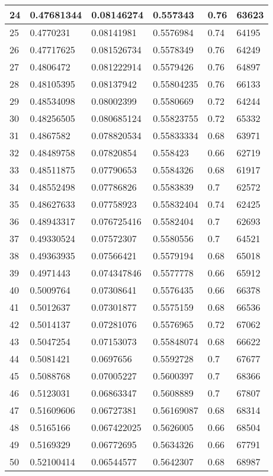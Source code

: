 \begin{longtable}{|l|l|l|l|l|l|}
24 & 0.47681344 & 0.08146274 & 0.557343 & 0.76 & 63623 \\ \hline 
25 & 0.4770231 & 0.08141981 & 0.5576984 & 0.74 & 64195 \\ \hline 
26 & 0.47717625 & 0.081526734 & 0.5578349 & 0.76 & 64249 \\ \hline 
27 & 0.4806472 & 0.081222914 & 0.5579426 & 0.76 & 64897 \\ \hline 
28 & 0.48105395 & 0.08137942 & 0.55804235 & 0.76 & 66133 \\ \hline 
29 & 0.48534098 & 0.08002399 & 0.5580669 & 0.72 & 64244 \\ \hline 
30 & 0.48256505 & 0.080685124 & 0.55823755 & 0.72 & 65332 \\ \hline 
31 & 0.4867582 & 0.078820534 & 0.55833334 & 0.68 & 63971 \\ \hline 
32 & 0.48489758 & 0.07820854 & 0.558423 & 0.66 & 62719 \\ \hline 
33 & 0.48511875 & 0.07790653 & 0.5584326 & 0.68 & 61917 \\ \hline 
34 & 0.48552498 & 0.07786826 & 0.5583839 & 0.7 & 62572 \\ \hline 
35 & 0.48627633 & 0.07758923 & 0.55832404 & 0.74 & 62425 \\ \hline 
36 & 0.48943317 & 0.076725416 & 0.5582404 & 0.7 & 62693 \\ \hline 
37 & 0.49330524 & 0.07572307 & 0.5580556 & 0.7 & 64521 \\ \hline 
38 & 0.49363935 & 0.07566421 & 0.5579194 & 0.68 & 65018 \\ \hline 
39 & 0.4971443 & 0.074347846 & 0.5577778 & 0.66 & 65912 \\ \hline 
40 & 0.5009764 & 0.07308641 & 0.5576435 & 0.66 & 66378 \\ \hline 
41 & 0.5012637 & 0.07301877 & 0.5575159 & 0.68 & 66536 \\ \hline 
42 & 0.5014137 & 0.07281076 & 0.5576965 & 0.72 & 67062 \\ \hline 
43 & 0.5047254 & 0.07153073 & 0.55848074 & 0.68 & 66622 \\ \hline 
44 & 0.5081421 & 0.0697656 & 0.5592728 & 0.7 & 67677 \\ \hline 
45 & 0.5088768 & 0.07005227 & 0.5600397 & 0.7 & 68366 \\ \hline 
46 & 0.5123031 & 0.06863347 & 0.5608889 & 0.7 & 67807 \\ \hline 
47 & 0.51609606 & 0.06727381 & 0.56169087 & 0.68 & 68314 \\ \hline 
48 & 0.5165166 & 0.067422025 & 0.5626005 & 0.66 & 68504 \\ \hline 
49 & 0.5169329 & 0.06772695 & 0.5634326 & 0.66 & 67791 \\ \hline 
50 & 0.52100414 & 0.06544577 & 0.5642307 & 0.68 & 68987 \\ \hline 
\end{longtable}